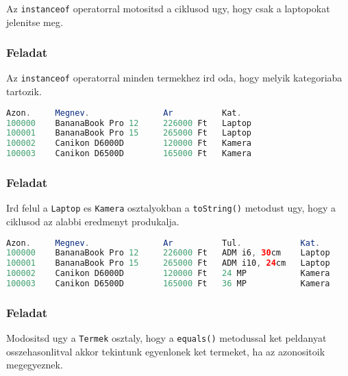 \documentclass{article}
\let\l\lstinline
\begin{document}
Az \l{instanceof} operatorral motositsd a ciklusod ugy, hogy csak a laptopokat jelenitse meg.

\subsubsection{Feladat}

Az \l{instanceof} operatorral minden termekhez ird oda, hogy melyik kategoriaba tartozik.

\begin{lstlisting}[language=Java, caption=Feladat]
Azon.     Megnev.               Ar          Kat.
100000    BananaBook Pro 12     226000 Ft   Laptop
100001    BananaBook Pro 15     265000 Ft   Laptop
100002    Canikon D6000D        120000 Ft   Kamera
100003    Canikon D6500D        165000 Ft   Kamera
\end{lstlisting}

\newpage

\subsubsection{Feladat}

Ird felul a \l{Laptop} es \l{Kamera} osztalyokban a \l{toString()} metodust ugy, hogy a ciklusod az alabbi eredmenyt produkalja.

\begin{lstlisting}[language=Java, caption=Feladat]
Azon.     Megnev.               Ar          Tul.            Kat.
100000    BananaBook Pro 12     226000 Ft   ADM i6, 30cm    Laptop
100001    BananaBook Pro 15     265000 Ft   ADM i10, 24cm   Laptop
100002    Canikon D6000D        120000 Ft   24 MP           Kamera
100003    Canikon D6500D        165000 Ft   36 MP           Kamera
\end{lstlisting}


\subsubsection{Feladat}

Modositsd ugy a \l{Termek} osztaly, hogy a \l{equals()} metodussal ket peldanyat osszehasonlitval akkor tekintunk egyenlonek ket termeket, ha az azonositoik megegyeznek.
\end{document}
